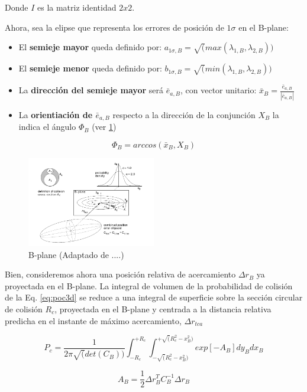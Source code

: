 Donde $I$ es la matriz identidad $2x2$.

Ahora, sea la elipse que representa los errores de posici\'on de $1\sigma$ en el B-plane:\\

\begin{itemize}
 \item El {\bf{semieje mayor}} queda definido por: $a_{1\sigma,B}=\sqrt(max(\lambda_{1,B},\lambda_{2,B}))$
 \item El {\bf{semieje menor}} queda definido por: $b_{1\sigma,B}=\sqrt(min(\lambda_{1,B},\lambda_{2,B}))$
 \item La {\bf{direcci\'on del semieje mayor}} ser\'a $\bar{e}_{a,B}$, con vector unitario: $ \bar{x}_{B}=\frac{\bar{e}_{a,B}}{|\bar{e}_{a,B}|}$ 
 \item La {\bf{orientiaci\'on de $\bar{e}_{a,B}$}} respecto a la direcci\'on de la conjunci\'on $X_{B}$ la indica el \'angulo $\Phi_{B}$ (ver \ref{fig:bplane})
\end{itemize}

\begin{equation}
 \Phi_{B}= arccos(\bar{x}_{B},X_{B})
\end{equation}

\begin{figure}[!h]
\centering
 \includegraphics[width=0.5\textwidth]{imagenes/akellabplane}
 \caption{ B-plane (Adaptado de ....)}
 \label{fig:bplane}
\end{figure}

Bien, consideremos ahora una posici\'on relativa de acercamiento $\Delta r_{B}$ ya proyectada en el B-plane. La integral de volumen de la probabilidad de colisi\'on de la Eq. \ref{eq:poc3d} se reduce a una integral de superficie sobre la secci\'on circular de colisi\'on $R_{c}$, proyectada en el B-plane y centrada a la distancia relativa predicha en el instante de m\'aximo acercamiento, $\Delta r_{tca}$

\begin{equation}
P_{c} = \frac{1}{2 \pi \sqrt(det(C_{B}))} \int_{-R_{c}}^{+R_{c}} \int_{-\sqrt(R^{2}_{c}-x^{2}_{B})}^{+\sqrt(R^{2}_{c}-x^{2}_{B})} exp [- A_{B}] dy_{B} dx_{B}
\end{equation}

\begin{equation}
A_{B}=\frac{1}{2}\Delta r^{T}_{B} C^{-1}_{B} \Delta r_{B}
\end{equation}








